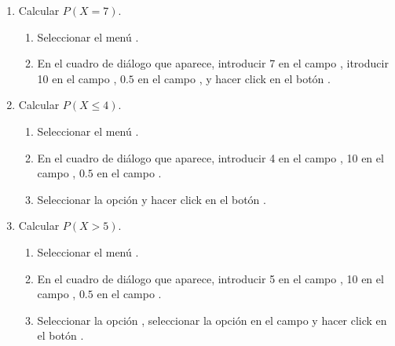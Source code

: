 \begin{enumerate}[leftmargin=*]
\begin{enumerate}
\item Calcular $P(X=7)$.
\begin{indicacion}
\begin{enumerate}
\item Seleccionar el menú .
\item En el cuadro de diálogo que aparece, introducir 7 en el campo ,
itroducir 10 en el campo , $0.5$ en el campo , y hacer click
en el botón .
\end{enumerate}
\end{indicacion}

\item Calcular $P(X\leq 4)$.
\begin{indicacion}
\begin{enumerate}
\item Seleccionar el menú .
\item En el cuadro de diálogo que aparece, introducir 4 en el campo , 10 en el campo
, $0.5$ en el campo .
\item Seleccionar la opción  y hacer click en el botón .
\end{enumerate}
\end{indicacion}

\item Calcular $P(X>5)$.
\begin{indicacion}
\begin{enumerate}
\item Seleccionar el menú .
\item En el cuadro de diálogo que aparece, introducir 5 en el campo , 10 en el campo
, $0.5$ en el campo .
\item Seleccionar la opción , seleccionar la opción 
en el campo  y hacer click en el botón .
\end{enumerate}
\end{indicacion}


\end{enumerate}
\end{enumerate}
